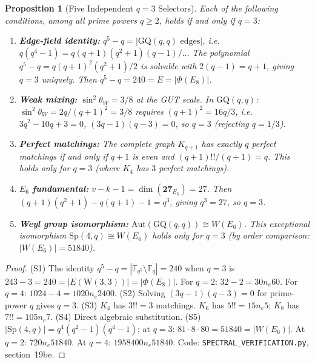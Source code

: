 \documentclass[12pt,a4paper]{article}
\newtheorem{proposition}[theorem]{Proposition}
\newcommand{\W}{\mathrm{W}(3,3)}
\renewcommand{\ne}{n_{\!e}}
\begin{document}
\begin{proposition}[Five Independent $q = 3$ Selectors]\label{prop:five-select}
Each of the following conditions, among all prime powers $q \ge 2$,
holds if and only if $q = 3$:
\begin{enumerate}[(S1)]
  \item \textbf{Edge-field identity:}
        $q^5 - q = |\mathrm{GQ}(q,q)\text{ edges}|$, i.e.\
        $q(q^4 - 1) = q(q+1)(q^2+1)(q-1)/\ldots$
        The polynomial $q^5 - q = q(q+1)^2(q^2+1)/2$
        is solvable with $2(q-1) = q+1$, giving $q = 3$
        uniquely.  Then $q^5 - q = 240 = E = |\Phi(E_8)|$.
  \item \textbf{Weak mixing:}
        $\sin^2\theta_W = 3/8$ at the GUT scale.
        In $\mathrm{GQ}(q,q)$: $\sin^2\theta_W = 2q/(q+1)^2 = 3/8$
        requires $(q+1)^2 = 16q/3$, i.e.\ $3q^2 - 10q + 3 = 0$,
        $(3q-1)(q-3)=0$, so $q = 3$ (rejecting $q = 1/3$).
  \item \textbf{Perfect matchings:}
        The complete graph $K_{q+1}$ has exactly $q$ perfect
        matchings if and only if $q+1$ is even and
        $(q+1)!! / (q+1) = q$. This holds only for $q = 3$
        (where $K_4$ has $3$ perfect matchings).
  \item \textbf{$E_6$ fundamental:}
        $v - k - 1 = \dim(\mathbf{27}_{E_6}) = 27$.
        Then $(q+1)(q^2+1) - q(q+1) - 1 = q^3$,
        giving $q^3 = 27$, so $q = 3$.
  \item \textbf{Weyl group isomorphism:}
        $\mathrm{Aut}(\mathrm{GQ}(q,q)) \cong W(E_6)$.
        This exceptional isomorphism
        $\mathrm{Sp}(4,q) \cong W(E_6)$ holds only for $q = 3$
        (by order comparison: $|W(E_6)| = 51840$).
\end{enumerate}
\end{proposition}

\begin{proof}
(S1) The identity $q^5 - q = |\mathbb{F}_{q^5} \setminus \mathbb{F}_q|
= 240$ when $q = 3$ is $243 - 3 = 240 = |E(\W)| = |\Phi(E_8)|$.
For $q = 2$: $32 - 2 = 30 \ne 60$.
For $q = 4$: $1024 - 4 = 1020 \ne 2400$.
(S2) Solving $(3q-1)(q-3) = 0$ for prime-power $q$ gives $q = 3$.
(S3) $K_4$ has $3!! = 3$ matchings.
$K_6$ has $5!! = 15 \ne 5$;
$K_8$ has $7!! = 105 \ne 7$.
(S4) Direct algebraic substitution.
(S5) $|\mathrm{Sp}(4,q)| = q^4(q^2-1)(q^4-1)$;
at $q = 3$: $81 \cdot 8 \cdot 80 = 51840 = |W(E_6)|$.
At $q = 2$: $720 \ne 51840$. At $q = 4$: $1958400 \ne 51840$.
Code: \texttt{SPECTRAL\_VERIFICATION.py}, section~19be.
\end{proof}
\end{document}
